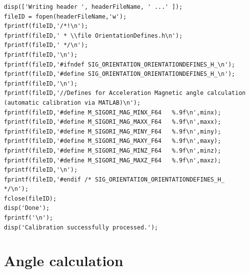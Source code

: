 \begin{lstlisting}
disp(['Writing header ', headerFileName, ' ...' ]);
fileID = fopen(headerFileName,'w');
fprintf(fileID,'/*!\n');
fprintf(fileID,' * \\file OrientationDefines.h\n');
fprintf(fileID,' */\n');
fprintf(fileID,'\n');
fprintf(fileID,'#ifndef SIG_ORIENTATION_ORIENTATIONDEFINES_H_\n');
fprintf(fileID,'#define SIG_ORIENTATION_ORIENTATIONDEFINES_H_\n');
fprintf(fileID,'\n');
fprintf(fileID,'//Defines for Acceleration Magnetic angle calculation (automatic calibration via MATLAB)\n');
fprintf(fileID,'#define M_SIGORI_MAG_MINX_F64	%.9f\n',minx);
fprintf(fileID,'#define M_SIGORI_MAG_MAXX_F64	%.9f\n',maxx);
fprintf(fileID,'#define M_SIGORI_MAG_MINY_F64	%.9f\n',miny);
fprintf(fileID,'#define M_SIGORI_MAG_MAXY_F64	%.9f\n',maxy);
fprintf(fileID,'#define M_SIGORI_MAG_MINZ_F64	%.9f\n',minz);
fprintf(fileID,'#define M_SIGORI_MAG_MAXZ_F64	%.9f\n',maxz);
fprintf(fileID,'\n');
fprintf(fileID,'#endif /* SIG_ORIENTATION_ORIENTATIONDEFINES_H_ */\n');
fclose(fileID);
disp('Done');
fprintf('\n');
disp('Calibration successfully processed.');

\end{lstlisting}




\section{Angle calculation}
\label{sec:angle}

